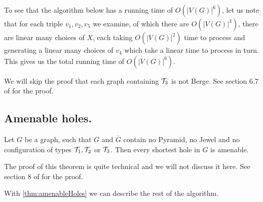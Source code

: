 \documentclass{report}
\begin{document}
To see that the algorithm below has a running time of $O(|V(G)|^6)$, let us note that for each triple $v_1, v_2, v_5$ we examine, of which there are $O(|V(G)|^3)$, there are linear many choices of $X$, each taking $O(|V(G)|^2)$ time to process and generating a linear many choices of $v_4$ which take a linear time to process in turn. This gives us the total running time of $O(|V(G)|^6)$.

We will skip the proof that each graph containing $\mathcal{T}_3$ is not Berge. See section 6.7 of \cite{MC05} for the proof.

\subsection{Amenable holes.}
\label{AmenableHoles}

\begin{theorem}
	\label{thm:amenableHoles}
	Let $G$ be a graph, such that $G$ and $\overline{G}$ contain no Pyramid, no Jewel and no configuration of types $\mathcal{T}_1, \mathcal{T}_2$ or $\mathcal{T}_3$. Then every shortest hole in $G$ is amenable.
\end{theorem}

The proof of this theorem is quite technical and we will not discuss it here. See section 8 of \cite{MC05} for the proof.

With \cref{thm:amenableHoles} we can describe the rest of the algorithm.
\end{document}
